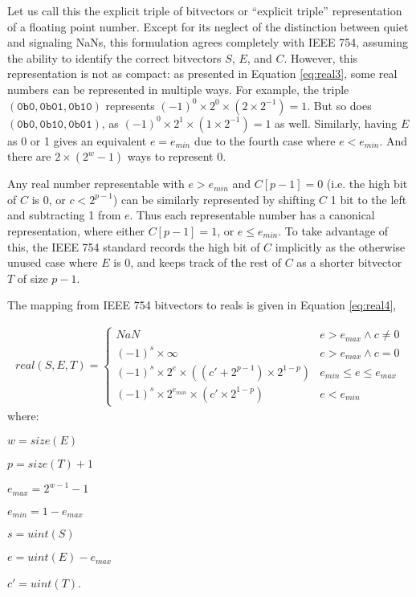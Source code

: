 \documentclass[letterpaper,10pt]{article}
\begin{document}
Let us call this the explicit triple of bitvectors or ``explicit triple'' representation of a floating point number. Except for its neglect of the distinction between quiet and signaling NaNs, this formulation agrees completely with IEEE 754, assuming the ability to identify the correct bitvectors $S$, $E$, and $C$. However, this representation is not as compact: as presented in Equation \ref{eq:real3}, some real numbers can be represented in multiple ways. For example, the triple $(\texttt{0b0}, \texttt{0b01}, \texttt{0b10})$ represents $(-1)^0 \times 2^0 \times (2 \times 2^{-1}) = 1$. But so does $(\texttt{0b0}, \texttt{0b10}, \texttt{0b01})$, as $(-1)^0 \times 2^1 \times (1 \times 2^{-1}) = 1$ as well. Similarly, having $E$ as 0 or 1 gives an equivalent $e = e_{min}$ due to the fourth case where $e < e_{min}$. And there are $2 \times (2^w - 1)$ ways to represent 0.

Any real number representable with $e > e_{min}$ and $C[p-1] = 0$ (i.e. the high bit of $C$ is 0, or $c < 2^{p-1}$) can be similarly represented by shifting $C$ 1 bit to the left and subtracting 1 from $e$. Thus each representable number has a canonical representation, where either $C[p-1] = 1$, or $e \leq e_{min}$. To take advantage of this, the IEEE 754 standard records the high bit of $C$ implicitly as the otherwise unused case where $E$ is 0, and keeps track of the rest of $C$ as a shorter bitvector $T$ of size $p - 1$.

The mapping from IEEE 754 bitvectors to reals is given in Equation \ref{eq:real4},

\begin{align} \label{eq:real4}
 real(S, E, T) =
 \begin{cases}
  NaN                                                         & e > e_{max} \land c \neq 0  \\
  (-1)^s \times \infty                                        & e > e_{max} \land c = 0     \\
  (-1)^s \times 2^{e} \times ((c' + 2^{p-1}) \times 2^{1-p})  & e_{min} \leq e \leq e_{max} \\
  (-1)^s \times 2^{e_{min}} \times (c' \times 2^{1 - p})      & e < e_{min}
 \end{cases}
\end{align}
where:
\begin{description}
 \item $w = size(E)$
 \item $p = size(T) + 1$
 \item $e_{max} = 2^{w-1} - 1$
 \item $e_{min} = 1 - e_{max}$
 \item $s = uint(S)$
 \item $e = uint(E) - e_{max}$
 \item $c' = uint(T)$.
\end{description}
\end{document}
